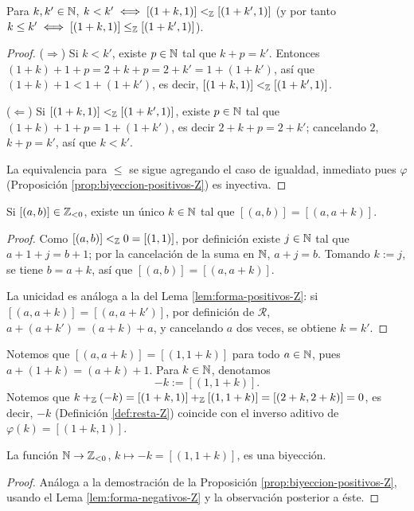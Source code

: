 \documentclass[12pt,a4paper]{book}
\begin{document}
    \begin{corolario}
        \label{coro:biyeccion-orden-Z}
        Para $k,k'\in\mathbb{N}$, $k<k' \iff [(1+k,1)]<_{\mathbb{Z}}[(1+k',1)]$ (y por tanto $k\le k' \iff [(1+k,1)]\le_{\mathbb{Z}}[(1+k',1)]$).
    \end{corolario}
    \begin{proof}
        ($\Rightarrow$) Si $k<k'$, existe $p\in\mathbb{N}$ tal que $k+p=k'$. Entonces $(1+k)+1+p = 2+k+p = 2+k' = 1+(1+k')$, así que $(1+k)+1<1+(1+k')$, es decir, $[(1+k,1)]<_{\mathbb{Z}}[(1+k',1)]$.

        ($\Leftarrow$) Si $[(1+k,1)]<_{\mathbb{Z}}[(1+k',1)]$, existe $p\in\mathbb{N}$ tal que $(1+k)+1+p=1+(1+k')$, es decir $2+k+p=2+k'$; cancelando $2$, $k+p=k'$, así que $k<k'$.

        La equivalencia para $\le$ se sigue agregando el caso de igualdad, inmediato pues $\varphi$ (Proposición \ref{prop:biyeccion-positivos-Z}) es inyectiva.
    \end{proof}

    \begin{lema}
        \label{lem:forma-negativos-Z}
        Si $[(a,b)]\in\mathbb{Z}_{<0}$, existe un único $k\in\mathbb{N}$ tal que $[(a,b)]=[(a,a+k)]$.
    \end{lema}
    \begin{proof}
        Como $[(a,b)]<_{\mathbb{Z}}0=[(1,1)]$, por definición existe $j\in\mathbb{N}$ tal que $a+1+j=b+1$; por la cancelación de la suma en $\mathbb{N}$, $a+j=b$. Tomando $k:=j$, se tiene $b=a+k$, así que $[(a,b)]=[(a,a+k)]$.

        La unicidad es análoga a la del Lema \ref{lem:forma-positivos-Z}: si $[(a,a+k)]=[(a,a+k')]$, por definición de $\mathcal{R}$, $a+(a+k')=(a+k)+a$, y cancelando $a$ dos veces, se obtiene $k=k'$.
    \end{proof}

    Notemos que $[(a,a+k)]=[(1,1+k)]$ para todo $a\in\mathbb{N}$, pues $a+(1+k)=(a+k)+1$. Para $k\in\mathbb{N}$, denotamos
    \begin{equation*}
        -k := [(1,1+k)].
    \end{equation*}
    Notemos que $k+_{\mathbb{Z}}(-k)=[(1+k,1)]+_{\mathbb{Z}}[(1,1+k)]=[(2+k,2+k)]=0$, es decir, $-k$ (Definición \ref{def:resta-Z}) coincide con el inverso aditivo de $\varphi(k)=[(1+k,1)]$.

    \begin{proposicion}
        \label{prop:biyeccion-negativos-Z}
        La función $\mathbb{N}\to\mathbb{Z}_{<0}$, $k\mapsto-k=[(1,1+k)]$, es una biyección.
    \end{proposicion}
    \begin{proof}
        Análoga a la demostración de la Proposición \ref{prop:biyeccion-positivos-Z}, usando el Lema \ref{lem:forma-negativos-Z} y la observación posterior a éste.
    \end{proof}
\end{document}

